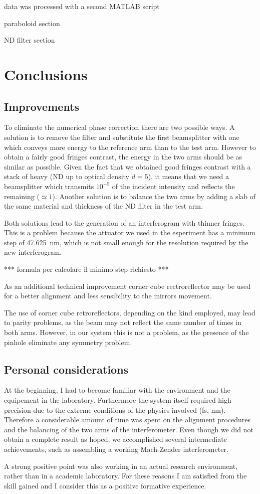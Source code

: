 \documentclass[12pt,a4paper,twoside]{article}
\begin{document}
data was processed with a second MATLAB script

paraboloid section

ND filter section


\clearpage
\section{Conclusions}
\subsection{Improvements}
To eliminate the numerical phase correction there are two possible ways.
A solution is to remove the filter and substitute the first beamsplitter with one which conveys more energy to the reference arm than to the test arm.
However to obtain a fairly good fringes contrast, the energy in the two arms should be as similar as possible.
Given the fact that we obtained good fringes contrast with a stack of heavy (ND up to optical density $d=5$), it means that we need a beamsplitter which transmits $10^{-5}$ of the incident intensity and reflects the remaining ($\simeq 1$).
Another solution is to balance the two arms by adding a slab of the same material and thickness of the ND filter in the test arm.

Both solutions lead to the generation of an interferogram with thinner fringes.
This is a problem because the attuator we used in the esperiment has a minimum step of \SI{47.625}{\nm}, which is not small enough for the resolution required by the new interferogram.

*** formula per calcolare il minimo step richiesto ***

As an additional technical improvement corner cube rectroreflector may be used for a better alignment and less sensibility to the mirrors movement.

The use of corner cube retroreflectors, depending on the kind employed, may lead to parity problems, as the beam may not reflect the same number of times in both arms.
However, in our system this is not a problem, as the presence of the pinhole eliminate any symmetry problem.

\subsection{Personal considerations}
At the beginning, I had to become familiar with the environment and the equipement in the
laboratory.
Furthermore the system itself required high precision due to the extreme conditions of the physics involved (\si{\fs}, \si{\nm}).
Therefore a considerable amount of time was spent on the alignment procedures and the balancing of the two arms of the interferometer.
Even though we did not obtain a complete result as hoped, we accomplished several intermediate achievements, such as assembling a working Mach-Zender interferometer.

A strong positive point was also working in an actual research environment, rather than in a academic laboratory.
For these reasons I am satisfied from the skill gained and I consider this as a positive formative experience.

\clearpage

\end{document}

